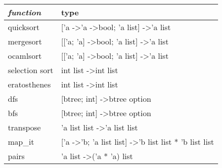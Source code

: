 \documentclass{easychair}
\theoremstyle{definition}
\begin{document}
\begin{table}[]
	\begin{tabular}{ll}
		\hline
		\textit{\textbf{function}} & type \\ \hline
		quicksort & {[}'a -\textgreater 'a -\textgreater bool; 'a list{]} -\textgreater 'a list \\
		mergesort & {[}{[}'a; 'a{]} -\textgreater bool; 'a list{]} -\textgreater 'a list \\
		ocamlsort & {[}{[}'a; 'a{]} -\textgreater bool; 'a list{]} -\textgreater 'a list \\
		selection sort & int list -\textgreater int list \\
		eratosthenes & int list -\textgreater int list \\
		dfs & {[}btree; int{]} -\textgreater btree option \\
		bfs & {[}btree; int{]} -\textgreater btree option \\
		transpose & 'a list list -\textgreater 'a list list \\
		map\_it & {[}'a -\textgreater 'b; 'a list list{]} -\textgreater 'b list list * 'b list list \\
		pairs & 'a list -\textgreater ('a * 'a) list \\ \hline
	\end{tabular}
\end{table}
\end{document}
